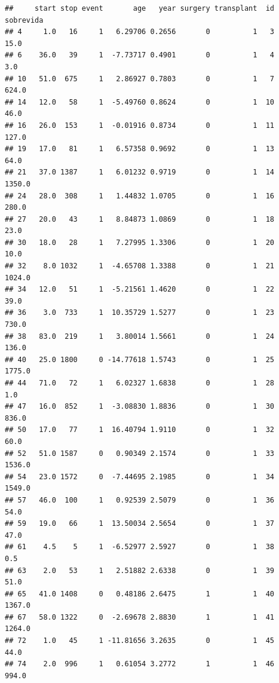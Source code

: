 \begin{Eje}
\begin{knitrout}
\begin{kframe}
{\ttfamily\noindent\bfseries\color{errorcolor}{\#\# Error in View(heart): X11 dataentry cannot be loaded}}\begin{alltt}
 \hlkwb{<-} \hlstd{stop[transplant}\hlopt{==}\hlstd{]} \hlopt{-} \hlstd{start[transplant}\hlopt{==}\hlstd{]}
\hlstd{(heart[transplant}\hlopt{==}\hlstd{,], sobrevida)}
\end{alltt}
\begin{verbatim}
##     start stop event       age   year surgery transplant  id sobrevida
## 4     1.0   16     1   6.29706 0.2656       0          1   3      15.0
## 6    36.0   39     1  -7.73717 0.4901       0          1   4       3.0
## 10   51.0  675     1   2.86927 0.7803       0          1   7     624.0
## 14   12.0   58     1  -5.49760 0.8624       0          1  10      46.0
## 16   26.0  153     1  -0.01916 0.8734       0          1  11     127.0
## 19   17.0   81     1   6.57358 0.9692       0          1  13      64.0
## 21   37.0 1387     1   6.01232 0.9719       0          1  14    1350.0
## 24   28.0  308     1   1.44832 1.0705       0          1  16     280.0
## 27   20.0   43     1   8.84873 1.0869       0          1  18      23.0
## 30   18.0   28     1   7.27995 1.3306       0          1  20      10.0
## 32    8.0 1032     1  -4.65708 1.3388       0          1  21    1024.0
## 34   12.0   51     1  -5.21561 1.4620       0          1  22      39.0
## 36    3.0  733     1  10.35729 1.5277       0          1  23     730.0
## 38   83.0  219     1   3.80014 1.5661       0          1  24     136.0
## 40   25.0 1800     0 -14.77618 1.5743       0          1  25    1775.0
## 44   71.0   72     1   6.02327 1.6838       0          1  28       1.0
## 47   16.0  852     1  -3.08830 1.8836       0          1  30     836.0
## 50   17.0   77     1  16.40794 1.9110       0          1  32      60.0
## 52   51.0 1587     0   0.90349 2.1574       0          1  33    1536.0
## 54   23.0 1572     0  -7.44695 2.1985       0          1  34    1549.0
## 57   46.0  100     1   0.92539 2.5079       0          1  36      54.0
## 59   19.0   66     1  13.50034 2.5654       0          1  37      47.0
## 61    4.5    5     1  -6.52977 2.5927       0          1  38       0.5
## 63    2.0   53     1   2.51882 2.6338       0          1  39      51.0
## 65   41.0 1408     0   0.48186 2.6475       1          1  40    1367.0
## 67   58.0 1322     0  -2.69678 2.8830       1          1  41    1264.0
## 72    1.0   45     1 -11.81656 3.2635       0          1  45      44.0
## 74    2.0  996     1   0.61054 3.2772       1          1  46     994.0

\end{verbatim}
\end{kframe}
\end{knitrout}
\end{Eje}
